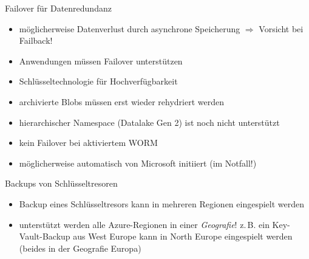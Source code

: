 \begin{flashcard}[Definition]{Failover für Datenredundanz}
  \begin{itemize}
    \item möglicherweise Datenverlust durch asynchrone Speicherung\newline
      $\Rightarrow$ Vorsicht bei Failback!    
    \item Anwendungen müssen Failover unterstützen
    \item Schlüsseltechnologie für Hochverfügbarkeit
    \item archivierte Blobs müssen erst wieder rehydriert werden
    \item hierarchischer Namespace (Datalake Gen 2) ist noch nicht unterstützt
    \item kein Failover bei aktiviertem WORM
    \item möglicherweise automatisch von Microsoft initiiert (im Notfall!)
  \end{itemize}
\end{flashcard}

\begin{flashcard}[Definition]{Backups von Schlüsseltresoren}
  \begin{itemize}
    \item Backup eines Schlüsseltresors kann in mehreren Regionen eingespielt werden
    \item unterstützt werden alle Azure-Regionen in einer \emph{Geografie}!\newline
      z.\,B. ein Key-Vault-Backup aus West Europe kann in North Europe eingespielt werden\newline
      (beides in der Geografie Europa)
  \end{itemize}
\end{flashcard}



